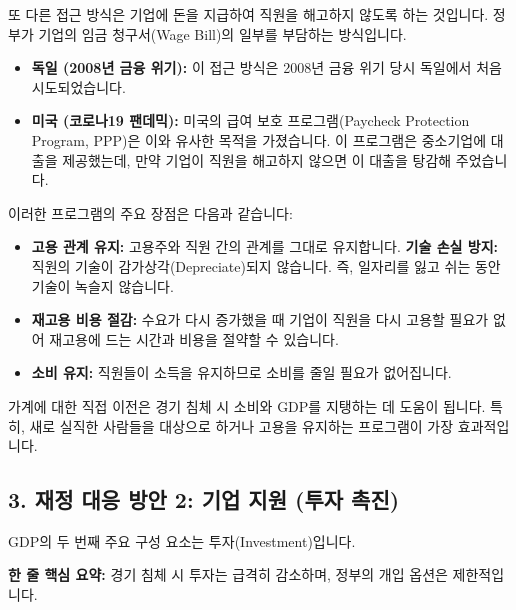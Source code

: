 \documentclass[11pt,a4paper]{book}
\theoremstyle{definition}
\begin{document}
또 다른 접근 방식은 기업에 돈을 지급하여 직원을 해고하지 않도록 하는 것입니다. 정부가 기업의 임금 청구서(Wage Bill)의 일부를 부담하는 방식입니다.

\begin{examplebox}[title={예시: 독일과 미국의 고용 유지 프로그램}]
    \begin{itemize}
        \item \textbf{독일 (2008년 금융 위기):} 이 접근 방식은 2008년 금융 위기 당시 독일에서 처음 시도되었습니다.
        \item \textbf{미국 (코로나19 팬데믹):} 미국의 급여 보호 프로그램(Paycheck Protection Program, PPP)은 이와 유사한 목적을 가졌습니다. 이 프로그램은 중소기업에 대출을 제공했는데, 만약 기업이 직원을 해고하지 않으면 이 대출을 탕감해 주었습니다.
    \end{itemize}
\end{examplebox}

이러한 프로그램의 주요 장점은 다음과 같습니다:
\begin{itemize}
    \item \textbf{고용 관계 유지:} 고용주와 직원 간의 관계를 그대로 유지합니다.
    \textbf{기술 손실 방지:} 직원의 기술이 감가상각(Depreciate)되지 않습니다. 즉, 일자리를 잃고 쉬는 동안 기술이 녹슬지 않습니다.
    \item \textbf{재고용 비용 절감:} 수요가 다시 증가했을 때 기업이 직원을 다시 고용할 필요가 없어 재고용에 드는 시간과 비용을 절약할 수 있습니다.
    \item \textbf{소비 유지:} 직원들이 소득을 유지하므로 소비를 줄일 필요가 없어집니다.
\end{itemize}

\begin{summarybox}[title={소비자 직접 이전의 결론}]
    가계에 대한 직접 이전은 경기 침체 시 소비와 GDP를 지탱하는 데 도움이 됩니다. 특히, 새로 실직한 사람들을 대상으로 하거나 고용을 유지하는 프로그램이 가장 효과적입니다.
\end{summarybox}


\subsection{3. 재정 대응 방안 2: 기업 지원 (투자 촉진)}

GDP의 두 번째 주요 구성 요소는 투자(Investment)입니다.

\begin{tcolorbox}[mybox={경기 침체 시 투자의 변화}]
    \textbf{한 줄 핵심 요약:} 경기 침체 시 투자는 급격히 감소하며, 정부의 개입 옵션은 제한적입니다.
\end{tcolorbox}
\end{document}
